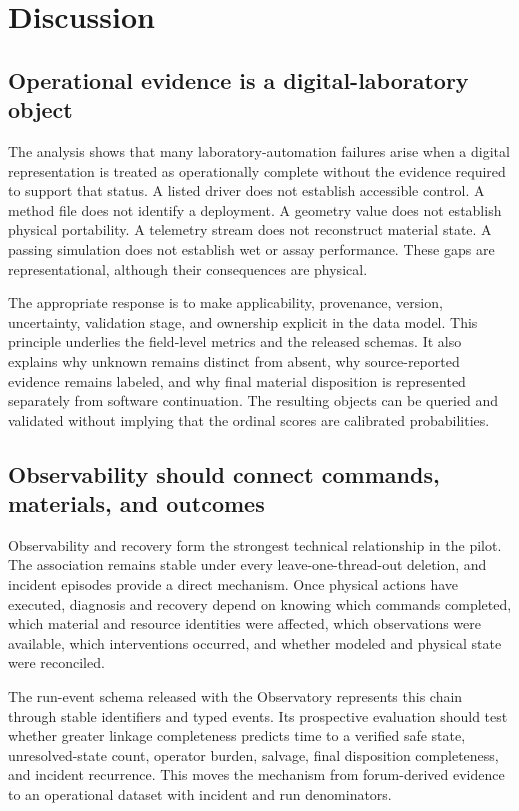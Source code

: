 \section{Discussion}
\label{sec:discussion}

\subsection{Operational evidence is a digital-laboratory object}

The analysis shows that many laboratory-automation failures arise when a digital representation is treated as operationally complete without the evidence required to support that status. A listed driver does not establish accessible control. A method file does not identify a deployment. A geometry value does not establish physical portability. A telemetry stream does not reconstruct material state. A passing simulation does not establish wet or assay performance. These gaps are representational, although their consequences are physical.

The appropriate response is to make applicability, provenance, version, uncertainty, validation stage, and ownership explicit in the data model. This principle underlies the field-level metrics and the released schemas. It also explains why unknown remains distinct from absent, why source-reported evidence remains labeled, and why final material disposition is represented separately from software continuation. The resulting objects can be queried and validated without implying that the ordinal scores are calibrated probabilities.

\subsection{Observability should connect commands, materials, and outcomes}

Observability and recovery form the strongest technical relationship in the pilot. The association remains stable under every leave-one-thread-out deletion, and incident episodes provide a direct mechanism. Once physical actions have executed, diagnosis and recovery depend on knowing which commands completed, which material and resource identities were affected, which observations were available, which interventions occurred, and whether modeled and physical state were reconciled.

The run-event schema released with the Observatory represents this chain through stable identifiers and typed events. Its prospective evaluation should test whether greater linkage completeness predicts time to a verified safe state, unresolved-state count, operator burden, salvage, final disposition completeness, and incident recurrence. This moves the mechanism from forum-derived evidence to an operational dataset with incident and run denominators.

